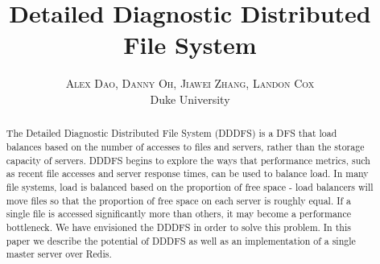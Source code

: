 \documentclass[twoside]{article}
\title{\vspace{-15mm}\fontsize{24pt}{10pt}\selectfont\textbf{Detailed Diagnostic Distributed File System}} %
\author{
\large
\textsc{Alex Dao, Danny Oh, Jiawei Zhang, Landon Cox}\\[2mm] %
\normalsize Duke University \\ %
\vspace{-5mm}
}
\date{}
\begin{document}
\maketitle %

\thispagestyle{fancy} %


\begin{abstract}

\noindent The Detailed Diagnostic Distributed File System (DDDFS) is a DFS that load balances based on the number of accesses to files and servers, rather than the storage capacity of servers. DDDFS begins to explore the ways that performance metrics, such as recent file accesses and server response times, can be used to balance load. In many file systems, load is balanced based on the proportion of free space - load balancers will move files so that the proportion of free space on each server is roughly equal. If a single file is accessed significantly more than others, it may become a performance bottleneck. We have envisioned the DDDFS in order to solve this problem. In this paper we describe the potential of DDDFS as well as an implementation of a single master server over Redis.

\end{abstract}

\end{document}
